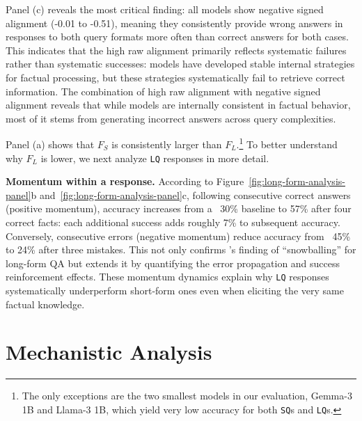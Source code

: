 \documentclass[11pt]{article}
\newcommand{\rparagraph}[1]{\vspace{1.2mm}\noindent\textbf{#1}}
\begin{document}
Panel (c) reveals the most critical finding: all models show negative signed alignment (-0.01 to -0.51), meaning they consistently provide wrong answers in responses to both query formats more often than correct answers for both cases. This indicates that the high raw alignment primarily reflects systematic failures rather than systematic successes: models have developed stable internal strategies for factual processing, but these strategies systematically fail to retrieve correct information. The combination of high raw alignment with negative signed alignment reveals that while models are internally consistent in factual behavior, most of it stems from generating incorrect answers across query complexities. %

Panel (a) shows that $F_S$ is consistently larger than $F_L$.\footnote{The only exceptions are the two smallest models in our evaluation, Gemma-3 1B and Llama-3 1B, which yield very low accuracy for both \texttt{SQ}s and \texttt{LQ}s.} To better understand why $F_L$ is lower, we next analyze \texttt{LQ} responses in more detail.

\rparagraph{Momentum within a response.} According to Figure~\ref{fig:long-form-analysis-panel}b and~\ref{fig:long-form-analysis-panel}c, following consecutive correct answers (positive momentum), accuracy increases from a ~30\% baseline to 57\% after four correct facts: each additional success adds roughly 7\% to subsequent accuracy. Conversely, consecutive errors (negative momentum) reduce accuracy from ~45\% to 24\% after three mistakes. This not only confirms \citet{zhang2024how}'s finding of ``snowballing'' for long-form QA but extends it by quantifying the error propagation and success reinforcement effects. 
%
These momentum dynamics explain why \texttt{LQ} responses systematically underperform short-form ones even when eliciting the very same factual knowledge.

\section{Mechanistic Analysis}\label{sec:mechanistic-analysis}
\end{document}
